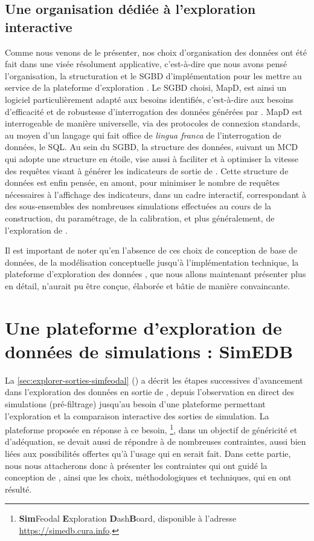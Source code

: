 \subsection*{Une organisation dédiée à l'exploration interactive}
Comme nous venons de le présenter, nos choix d'organisation des données ont été fait dans une visée résolument applicative, c'est-à-dire que nous avons pensé l'organisation, la structuration et le SGBD d'implémentation pour les mettre au service de la plateforme d'exploration \simedb{}.
Le SGBD choisi, MapD, est ainsi un logiciel particulièrement adapté aux besoins identifiés, c'est-à-dire aux besoins d'efficacité et de robustesse d'interrogation des données générées par \simfeodal{}.
MapD est interrogeable de manière universelle, via des protocoles de connexion standards, au moyen d'un langage qui fait office de \textit{lingua franca} de l'interrogation de données, le SQL.
Au sein du SGBD, la structure des données, suivant un MCD qui adopte une structure \og en étoile\fg{}, vise aussi à faciliter et à optimiser la vitesse des requêtes visant à générer les indicateurs de sortie de \simfeodal{}.
Cette structure de données est enfin pensée, en amont, pour minimiser le nombre de requêtes nécessaires à l'affichage des indicateurs, dans un cadre interactif, correspondant à des sous-ensembles des nombreuses simulations effectuées au cours de la construction, du paramétrage, de la calibration, et plus généralement, de l'exploration de \simfeodal{}.

Il est important de noter qu'en l'absence de ces choix de conception de base de données, de la modélisation conceptuelle jusqu'à l'implémentation technique, la plateforme d'exploration des données \simedb{}, que nous allons maintenant présenter plus en détail, n'aurait pu être conçue, élaborée et bâtie de manière convaincante.

\section[Une plateforme d'exploration de données de simulations : SimEDB]{Une plateforme d'exploration de données de simulations : SimEDB%
	}\label{sec:SimEDB}

La \cref{sec:explorer-sorties-simfeodal} () a décrit les étapes successives d'avancement dans l'exploration des données en sortie de \simfeodal{}, depuis l'observation en direct des simulations (\og pré-filtrage\fg{}) jusqu'au besoin d'une plateforme permettant l'exploration et la comparaison interactive des sorties de simulation.
La plateforme proposée en réponse à ce besoin, \simedb{}\footnote{
	\textbf{Sim}Feodal \textbf{E}xploration \textbf{D}ash\textbf{B}oard, disponible à l'adresse \href{https://simedb.cura.info}{https://simedb.cura.info}.
}, dans un objectif de généricité et d'adéquation, se devait aussi de répondre à de nombreuses contraintes, aussi bien liées aux possibilités offertes qu'à l'usage qui en serait fait.
Dans cette partie, nous nous attacherons donc à présenter les contraintes qui ont guidé la conception de \simedb{}, ainsi que les choix, méthodologiques et techniques, qui en ont résulté.\vspace{-0.5cm}

